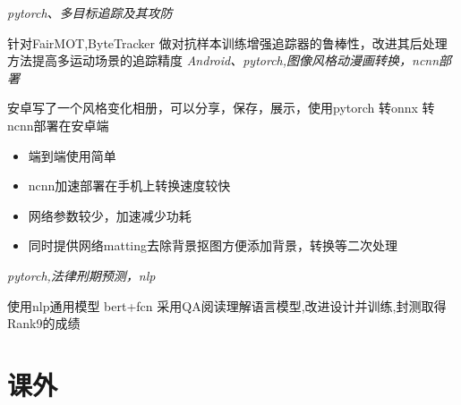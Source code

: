 \documentclass{uniquecv}
\begin{document}
\textit{pytorch、多目标追踪及其攻防}
\vspace{0.4ex}

针对FairMOT,ByteTracker 做对抗样本训练增强追踪器的鲁棒性，改进其后处理方法提高多运动场景的追踪精度
\textit{Android、pytorch,图像风格动漫画转换，ncnn部署}
\vspace{0.4ex}

安卓写了一个风格变化相册，可以分享，保存，展示，使用pytorch 转onnx 转 ncnn部署在安卓端
\begin{itemize}
  \item 端到端使用简单
  \item ncnn加速部署在手机上转换速度较快
  \item 网络参数较少，加速减少功耗
  \item 同时提供网络matting去除背景抠图方便添加背景，转换等二次处理
\end{itemize}
\textit{pytorch,法律刑期预测，nlp}
\vspace{0.4ex}

使用nlp通用模型 bert+fcn 采用QA阅读理解语言模型,改进设计并训练,封测取得Rank9的成绩

\section{课外}
\end{document}
